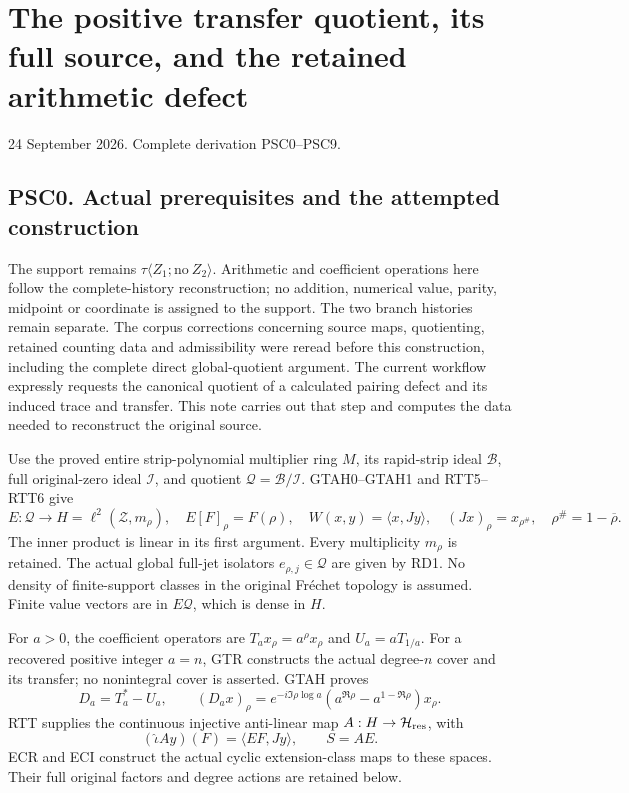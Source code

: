\section{The positive transfer quotient, its full source, and the
retained arithmetic
defect}\label{the-positive-transfer-quotient-its-full-source-and-the-retained-arithmetic-defect}

24 September 2026. Complete derivation PSC0--PSC9.

\subsection{PSC0. Actual prerequisites and the attempted
construction}\label{psc0.-actual-prerequisites-and-the-attempted-construction}

The support remains \(\tau\langle Z_1;\mathrm{no}\ Z_2\rangle\).
Arithmetic and coefficient operations here follow the complete-history
reconstruction; no addition, numerical value, parity, midpoint or
coordinate is assigned to the support. The two branch histories remain
separate. The corpus corrections concerning source maps, quotienting,
retained counting data and admissibility were reread before this
construction, including the complete direct global-quotient argument.
The current workflow expressly requests the canonical quotient of a
calculated pairing defect and its induced trace and transfer. This note
carries out that step and computes the data needed to reconstruct the
original source.

Use the proved entire strip-polynomial multiplier ring \(M\), its
rapid-strip ideal \(\mathcal B\), full original-zero ideal
\(\mathcal I\), and quotient \(\mathcal Q=\mathcal B/\mathcal I\).
GTAH0--GTAH1 and RTT5--RTT6 give \[
E:\mathcal Q\longrightarrow H=\ell^2(\mathscr Z,m_\rho),\quad E[F]_\rho=F(\rho),
\quad W(x,y)=\langle x,Jy\rangle,
\quad (Jx)_\rho=x_{\rho^\#},\quad\rho^\#=1-\overline\rho.
\tag{PSC0.1}
\] The inner product is linear in its first argument. Every multiplicity
\(m_\rho\) is retained. The actual global full-jet isolators
\(e_{\rho,j}\in\mathcal Q\) are given by RD1. No density of
finite-support classes in the original Fréchet topology is assumed.
Finite value vectors are in \(E\mathcal Q\), which is dense in \(H\).

For \(a>0\), the coefficient operators are \(T_a x_\rho=a^\rho x_\rho\)
and \(U_a=aT_{1/a}\). For a recovered positive integer \(a=n\), GTR
constructs the actual degree-\(n\) cover and its transfer; no
nonintegral cover is asserted. GTAH proves \[
D_a=T_a^*-U_a,\qquad
(D_a x)_\rho=e^{-i\Im\rho\log a}
(a^{\Re\rho}-a^{1-\Re\rho})x_\rho.
\tag{PSC0.2}
\] RTT supplies the continuous injective anti-linear map
\(A:H\to\mathcal H_{\rm res}\), with \[
(\widehat\iota Ay)(F)=\langle EF,Jy\rangle,\qquad S=AE.
\tag{PSC0.3}
\] ECR and ECI construct the actual cyclic extension-class maps to these
spaces. Their full original factors and degree actions are retained
below.

